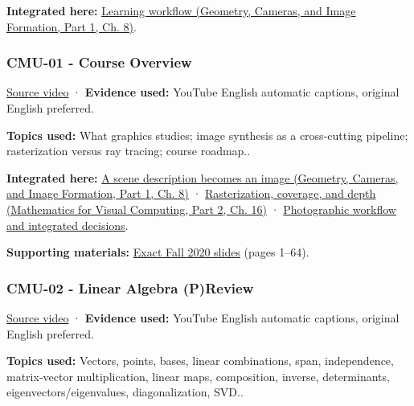 \textbf{Integrated here:} \href{../03-Geometry-Cameras-and-Image-Formation-P01/main.pdf\#nameddest=03-visual-computing-i-ch001-how-to-use-this-volume-without-losing-the-thread}{Learning workflow (Geometry, Cameras, and Image Formation, Part 1, Ch. 8)}.

\subsubsection{CMU-01 - Course Overview}\label{04-visual-computing-ii-ch036-cmu-01---course-overview}

\hypertarget{04-visual-computing-ii-ch036-cmu-01---course-overview}{}

\href{https://www.youtube.com/watch?v=PhxV_JrXeVk}{Source video} · \textbf{Evidence used:} YouTube English automatic captions, original English preferred.

\textbf{Topics used:} What graphics studies; image synthesis as a cross-cutting pipeline; rasterization versus ray tracing; course roadmap..

\textbf{Integrated here:} \href{../03-Geometry-Cameras-and-Image-Formation-P01/main.pdf\#nameddest=03-visual-computing-i-ch001-a-scene-description-becomes-an-image}{A scene description becomes an image (Geometry, Cameras, and Image Formation, Part 1, Ch. 8)} · \href{../02-Mathematics-for-Visual-Computing-P02/main.pdf\#nameddest=03-visual-computing-i-ch012-rasterization-coverage-and-depth}{Rasterization, coverage, and depth (Mathematics for Visual Computing, Part 2, Ch. 16)} · \hyperref[04-visual-computing-ii-ch034-photographic-workflow-and-integrated-decisions]{Photographic workflow and integrated decisions}.

\textbf{Supporting materials:} \href{https://15462.courses.cs.cmu.edu/fall2020content/lectures/01_intro/01_intro_slides.pdf}{Exact Fall 2020 slides} (pages 1--64).

\subsubsection{CMU-02 - Linear Algebra (P)Review}\label{04-visual-computing-ii-ch036-cmu-02---linear-algebra-preview}

\hypertarget{04-visual-computing-ii-ch036-cmu-02---linear-algebra-preview}{}

\href{https://www.youtube.com/watch?v=2c8XQlQApx8}{Source video} · \textbf{Evidence used:} YouTube English automatic captions, original English preferred.

\textbf{Topics used:} Vectors, points, bases, linear combinations, span, independence, matrix-vector multiplication, linear maps, composition, inverse, determinants, eigenvectors/eigenvalues, diagonalization, SVD..

